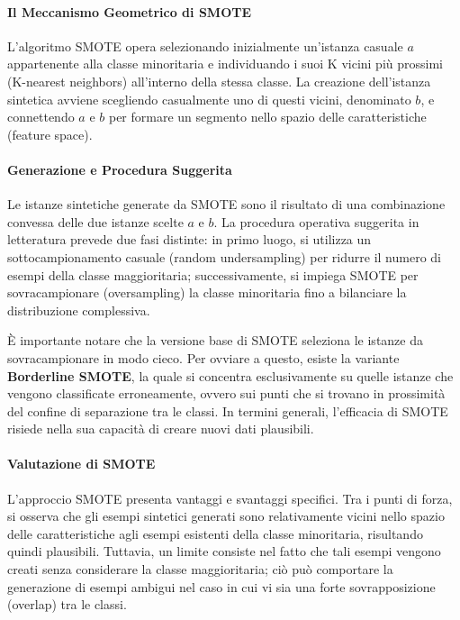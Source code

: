 \paragraph{Il Meccanismo Geometrico di SMOTE}

L'algoritmo SMOTE opera selezionando inizialmente un'istanza
casuale $a$ appartenente alla classe minoritaria e individuando
i suoi K vicini più prossimi (K-nearest neighbors) all'interno
della stessa classe. La creazione dell'istanza sintetica avviene
scegliendo casualmente uno di questi vicini, denominato $b$, e
connettendo $a$ e $b$ per formare un segmento nello spazio delle
caratteristiche (feature space).

\paragraph{Generazione e Procedura Suggerita}

Le istanze sintetiche generate da SMOTE sono il risultato di una
combinazione convessa delle due istanze scelte $a$ e $b$.
La procedura operativa suggerita in letteratura prevede due fasi
distinte: in primo luogo, si utilizza un sottocampionamento
casuale (random undersampling) per ridurre il numero di esempi
della classe maggioritaria; successivamente, si impiega SMOTE
per sovracampionare (oversampling) la classe minoritaria fino a bilanciare la
distribuzione complessiva.

È importante notare che la versione base di SMOTE seleziona le
istanze da sovracampionare in modo cieco. Per ovviare a questo,
esiste la variante \textbf{Borderline SMOTE}, la quale si
concentra esclusivamente su quelle istanze che vengono
classificate erroneamente, ovvero sui punti che si trovano in
prossimità del confine di separazione tra le classi. In termini
generali, l'efficacia di SMOTE risiede nella sua capacità di
creare nuovi dati plausibili.

\paragraph{Valutazione di SMOTE}

L'approccio SMOTE presenta vantaggi e svantaggi specifici.
Tra i punti di forza, si osserva che gli esempi sintetici
generati sono relativamente vicini nello spazio delle
caratteristiche agli esempi esistenti della classe minoritaria,
risultando quindi plausibili. Tuttavia, un limite consiste nel
fatto che tali esempi vengono creati senza considerare la classe
maggioritaria; ciò può comportare la generazione di esempi
ambigui nel caso in cui vi sia una forte sovrapposizione
(overlap) tra le classi.

